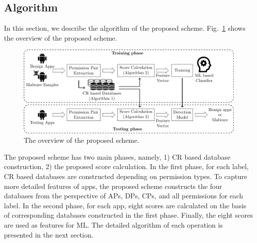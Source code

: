 \documentclass{ieeeaccess}
\newcommand{\myfigurename}{Fig.}
\begin{document}
\subsection{Algorithm}
In this section, we describe the algorithm of the proposed scheme.
\myfigurename~\ref{fig:overview} shows the overview of the proposed scheme.
\begin{figure}[t]
  \centering
  \includegraphics[scale=0.80]{./figures/kato8.pdf}
  \caption{The overview of the proposed scheme.}
  \label{fig:overview}
\end{figure}
The proposed scheme has two main phases, namely, 1) CR based database construction, 2) the proposed score calculation.
In the first phase, for each label, CR based databases are constructed depending on permission types.
To capture more detailed features of apps, the proposed scheme constructs the four databases from the perspective of APs, DPs, CPs, and all permissions for each label.
In the second phase, for each app, eight scores are calculated on the basis of corresponding databases constructed in the first phase.
Finally, the eight scores are used as features for ML.
The detailed algorithm of each operation is presented in the next section.

\makeatletter
\newcommand{\multiline}[1]{%
  \begin{tabularx}{\dimexpr\linewidth-\ALG@thistlm}[t]{@{}X@{}}
    #1
  \end{tabularx}
}
\makeatother
\newcommand{\TRAINDATASET}{D_{\mathrm{training}}} %
\newcommand{\PTYPE}{pt} %
\newcommand{\DB}{D^{\PTYPE, l}} %
\newcommand{\DBA}{DB^{\mathrm{android}}} %
\newcommand{\DBD}{DB^{\mathrm{dangerous}}} %
\newcommand{\DBC}{DB^{\mathrm{custom}}} %
\newcommand{\TRAINAPP}[1]{ta_{#1}} %
\newcommand{\TRAINPERMISSIONSET}{TP_{\PTYPE, l}} %
\newcommand{\PERMISSIONSET}[1]{P^{\PTYPE, l}_{#1}} %
\newcommand{\PERMISSIONPAIRSET}[1]{P^{\mathrm{pair}}_{#1}} %
\newcommand{\CRATIO}[1]{cr_{#1}} %
\newcommand{\PAIR}{(p_j, p_k)} %
\end{document}
